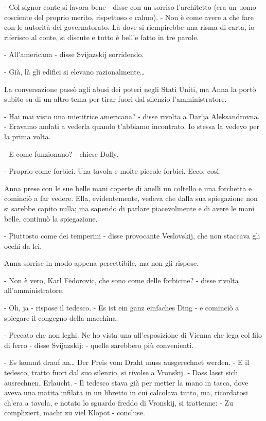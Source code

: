 - Col signor conte si lavora bene - disse con un sorriso l'architetto (era un uomo cosciente del proprio merito, rispettoso e calmo). - Non è come avere a che fare con le autorità del governatorato. Là dove si riempirebbe una risma di carta, io riferisco al conte, si discute e tutto è bell'e fatto in tre parole. 

- All'americana - disse Svijazskij sorridendo. 

- Già, là gli edifici si elevano razionalmente\ldots{} 

La conversazione passò agli abusi dei poteri negli Stati Uniti, ma Anna la portò subito su di un altro tema per tirar fuori dal silenzio l'amministratore. 

- Hai mai visto una mietitrice americana? - disse rivolta a Dar'ja Aleksandrovna. - Eravamo andati a vederla quando t'abbiamo incontrato. Io stessa la vedevo per la prima volta. 

- E come funzionano? - chiese Dolly. 

- Proprio come forbici. Una tavola e molte piccole forbici. Ecco, così. 

Anna prese con le sue belle mani coperte di anelli un coltello e una forchetta e cominciò a far vedere. Ella, evidentemente, vedeva che dalla sua spiegazione non si sarebbe capito nulla; ma sapendo di parlare piacevolmente e di avere le mani belle, continuò la spiegazione. 

- Piuttosto come dei temperini - disse provocante Veslovskij, che non staccava gli occhi da lei. 

Anna sorrise in modo appena percettibile, ma non gli rispose. 

- Non è vero, Karl Fëdorovic, che sono come delle forbicine? - disse rivolta all'amministratore. 

- Oh, ja - rispose il tedesco. - Es ist ein ganz einfaches Ding - e cominciò a spiegare il congegno della macchina. 

- Peccato che non leghi. Ne ho vista una all'esposizione di Vienna che lega col filo di ferro - disse Svijazskij: - quelle sarebbero più convenienti. 

- Es kommt drauf an\ldots{} Der Preis vom Draht muss ausgerechnet werden. - E il tedesco, tratto fuori dal suo silenzio, si rivolse a Vronskij. - Dass lasst sich ausrechnen, Erlaucht. - Il tedesco stava già per metter la mano in tasca, dove aveva una matita infilata in un libretto in cui calcolava tutto, ma, ricordatosi ch'era a tavola, e notato lo sguardo freddo di Vronskij, si trattenne: - Zu compliziert, macht zu viel Klopot - concluse. 


